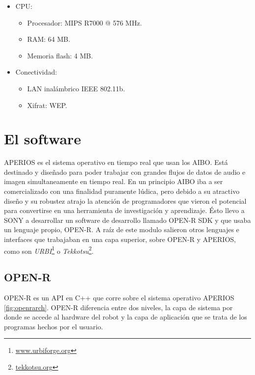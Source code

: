 \documentclass[12pt,a4paper,final,twoside]{book}
\begin{document}
\begin{multicols}{2}
\begin{itemize}
\begin{itemize}
\item Altura: 278 mm.
\item Largo: 319 mm.
\item Ancho: 180 mm.
\item Peso con batería: 1.65 Kg. 
\end{itemize}
\item CPU:
\begin{itemize}
\item Procesador: MIPS R7000 @ 576 MHz.
\item RAM: 64 MB.
\item Memoria flash: 4 MB.
\end{itemize}
\end{itemize}
\begin{itemize}
\item Conectividad:
\begin{itemize}
\item LAN inalámbrico IEEE 802.11b.
\item Xifrat: WEP.
\end{itemize}
\end{itemize}
\end{multicols}

\section{El software}
APERIOS es el sistema operativo en tiempo real que usan los AIBO. Está destinado y diseñado para poder trabajar con grandes flujos de datos de audio e imagen simultaneamente en tiempo real.
En un principio AIBO iba a ser comercializado con una finalidad puramente lúdica, pero debido a su atractivo diseño y su robustez atrajo la atención de programadores que vieron el potencial para convertirse en una herramienta de investigación y aprendizaje. Ésto llevo a SONY a desarrollar un software de desarrollo llamado OPEN-R SDK y que usaba un lenguaje propio, OPEN-R. A raíz de este modulo salieron otros lenguajes e interfaces que trabajaban en una capa superior, sobre OPEN-R y APERIOS, como son \textit{URBI}\footnote{\url{www.urbiforge.org}} o \textit{Tekkotsu}\footnote{\url{tekkotsu.org}}.

\subsection{OPEN-R}
OPEN-R es un API en C++ que corre sobre el sistema operativo APERIOS \ref{fig:openrarch}. OPEN-R diferencia entre dos niveles, la capa de sistema por donde se accede al hardware del robot y la capa de aplicación que se trata de los programas hechos por el usuario.
\end{document}
